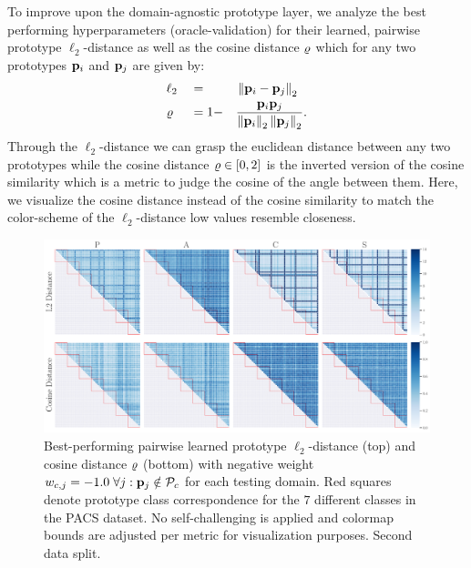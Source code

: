 To improve upon the domain-agnostic prototype layer, we analyze the best performing hyperparameters (oracle-validation) for their learned, pairwise prototype $\ell_2$-distance as well as the cosine distance $\varrho$ which for any two prototypes $\mathbf{p}_i$ and $\mathbf{p}_{j}$ are given by:
\begin{alignat}{3}
\label{eq:pairwise_prot_distances}
    &\ell_2 &&= &&\left\|\mathbf{p}_i - \mathbf{p}_{j}  \right\|_2\\ 
    &\varrho &&= 1- &&\frac{\mathbf{p}_i\mathbf{p}_{j}}{\left\|\mathbf{p}_i \right\|_2 \left\|\mathbf{p}_{j} \right\|_2} .
\end{alignat}
Through the $\ell_2$-distance we can grasp the euclidean distance between any two prototypes while the cosine distance $\varrho \in [0,2]$ is the inverted version of the cosine similarity which is a metric to judge the cosine of the angle between them. Here, we visualize the cosine distance instead of the cosine similarity to match the color-scheme of the $\ell_2$-distance \ie low values resemble closeness. 


\begin{figure}[t]
    \centering
    \includegraphics[width=\textwidth]{Figures/Chapter4/2021-01-21-ProDropIncorrectWeight-1.0SAVEResNet18oracle_validation_trial1.pdf}
    \caption[Second data split pairwise prototype distances with $w_{c,j} = -1.0$] {Best-performing pairwise learned prototype $\ell_2$-distance (top) and cosine distance $\varrho$ (bottom) with negative weight $w_{c,j} = -1.0\; \forall j: \mathbf{p}_{j} \notin \mathcal{P}_c$ for each testing domain. Red squares denote prototype class correspondence for the $7$ different classes in the PACS dataset. No self-challenging is applied and colormap bounds are adjusted per metric for visualization purposes. Second data split.}
    \label{fig:pw_distance_trial1}
\end{figure}


